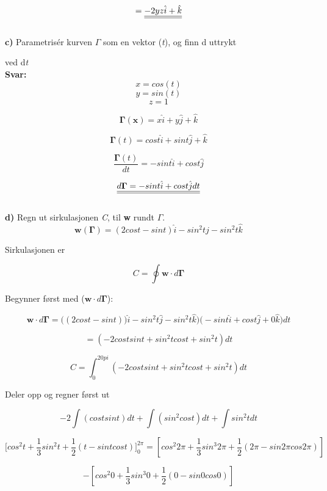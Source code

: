 \documentclass[a4paper,norsk,12pt]{article}
\begin{document}
$$
\def\doubleunderline#1{\underline{\underline{#1}}}
= \doubleunderline{-2yz \hat i + \hat k}
$$ \\

\textbf{c)} Parametrisér kurven {$\Gamma$} som en vektor \bm{$\Gamma$} (\textit{t}), og finn d \bm{$\Gamma$} uttrykt 

\hspace{4mm} ved d{\textit{t}}\\

\textbf{Svar:} \\

$$
x = cos(t)
$$
$$
y = sin(t)
$$
$$
z = 1
$$

$$\bm{\Gamma} (\bm{x})= x \hat i + y \hat j + \hat k $$

$$\bm{\Gamma} ({t}) = cos t \hat i + sin t \hat j + \hat k $$

$$ \dfrac{\bm{\Gamma} ({t})}{dt} = -sin t \hat i + cos t \hat j $$


$$
\def\doubleunderline#1{\underline{\underline{#1}}}
\doubleunderline{d \bm{\Gamma}   = -sin t \hat i + cos t \hat j dt}
$$\\

\textbf{d)} Regn ut sirkulasjonen \textit{C}, til \textbf{w} rundt $\Gamma$.\\

$$
\textbf{w} (\bm{\Gamma}) =  (2 cos t - sin t) \hat i - sin^2 t \hat j - sin^2 t \hat k
$$

Sirkulasjonen er 

$$ C = \oint \textbf{w} \cdot d {\bm{\Gamma} } $$

Begynner først med ($\bm{w} \cdot d {\bm{\Gamma} }$):

$$
\bm{w} \cdot d {\bm{\Gamma} } = \Big( (2 cos t - sin t) ) \hat i - sin^2 t \hat j - sin^2 t \hat k \Big) \Big( -sin t \hat i + cos t \hat j + 0 \hat k \Big) dt
$$

$$
= (-2cos t sin t + sin^2 t cos t + sin^2 t ) dt 
$$

$$
C = \int_0^{2 0pi}  (-2cos t sin t + sin^2 t cos t + sin^2 t ) dt
$$

Deler opp og regner først ut

$$
-2 \int (cos t sin t ) dt + \int (sin^2 cos t) dt + \int sin^2 t dt
$$


$$\Big[cos^2 t + \dfrac{1}{3} sin^2 t + \dfrac{1}{2} (t - sin t cos t) \Big]_0^{2 \pi} = [cos^2 2\pi + \dfrac{1}{3} sin^3 2\pi + \dfrac{1}{2} ({2 \pi} - sin {2 \pi} cos {2 \pi})] 
$$

$$
-[cos^2 0 + \dfrac{1}{3} sin^3 0 + \dfrac{1}{2} ({0} - sin {0} cos {0})] 
$$
\end{document}
